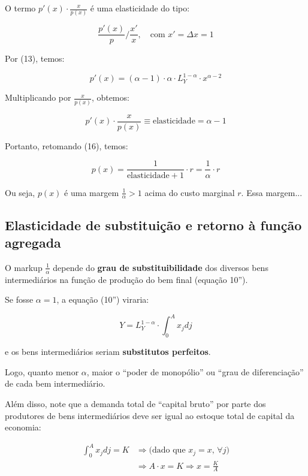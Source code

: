 \documentclass[a4paper,12pt]{article}[abntex2]
\begin{document}
\noindent O termo $p'(x) \cdot \frac{x}{p(x)}$ é uma elasticidade do tipo:

\[
\frac{p'(x)}{p} \Big/ \frac{x'}{x}, \quad \text{com } x' = \Delta x = 1
\]

\vspace{0.2cm}
\noindent Por (13), temos:

\[
p'(x) = (\alpha - 1) \cdot \alpha \cdot L_Y^{1 - \alpha} \cdot x^{\alpha - 2}
\]

Multiplicando por $\frac{x}{p(x)}$, obtemos:

\[
p'(x) \cdot \frac{x}{p(x)} \equiv \text{elasticidade} = \alpha - 1
\]

\vspace{0.2cm}
Portanto, retomando (16), temos:

\begin{equation}
p(x) = \frac{1}{\text{elasticidade} + 1} \cdot r = \frac{1}{\alpha} \cdot r \tag{17}
\end{equation}

Ou seja, $p(x)$ é uma margem $\frac{1}{\alpha} > 1$ acima do custo marginal $r$. Essa margem...

\subsection{\textbf{Elasticidade de substituição e retorno à função agregada}}

O markup $\frac{1}{\alpha}$ depende do \textbf{grau de substituibilidade} dos diversos bens intermediários na função de produção do bem final (equação 10'').

Se fosse $\alpha = 1$, a equação (10'') viraria:

\[
Y = L_Y^{1 - \alpha} \cdot \int_0^A x_j dj
\]

e os bens intermediários seriam \textbf{substitutos perfeitos}.

Logo, quanto menor $\alpha$, maior o ``poder de monopólio'' ou ``grau de diferenciação'' de cada bem intermediário.

Além disso, note que a demanda total de ``capital bruto'' por parte dos produtores de bens intermediários deve ser igual ao estoque total de capital da economia:

\begin{align*}
\int_0^A x_j dj = K 
&\Rightarrow \text{(dado que $x_j = x$, $\forall j$)} \\
&\Rightarrow A \cdot x = K \Rightarrow x = \frac{K}{A} \tag{18}
\end{align*}
\end{document}
